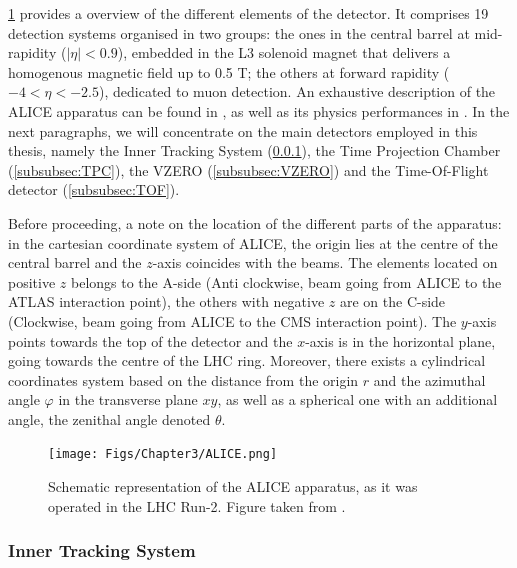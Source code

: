 \Fig\ref{fig:ALICEdetector} provides a overview of the different elements of the detector. It comprises 19 detection systems organised in two groups: the ones in the central barrel at mid-rapidity ($|\eta| < 0.9$), embedded in the L3 solenoid magnet that delivers a homogenous magnetic field up to 0.5 T; the others at forward rapidity ($-4 < \eta < -2.5$), dedicated to muon detection. An exhaustive description of the ALICE apparatus can be found in \cite{alicecollaborationALICEExperimentCERN2008}, as well as its physics performances in \cite{carminatiALICEPhysicsPerformance2004}\cite{alicecollaborationALICEPhysicsPerformance2006}\cite{alicecollaborationPerformanceALICEExperiment2014}. In the next paragraphs, we will concentrate on the main detectors employed in this thesis, namely the Inner Tracking System (\ref{subsubsec:ITS}), the Time Projection Chamber (\ref{subsubsec:TPC}), the VZERO (\ref{subsubsec:VZERO}) and the Time-Of-Flight detector (\ref{subsubsec:TOF}). 

Before proceeding, a note on the location of the different parts of the apparatus: in the cartesian coordinate system of ALICE, the origin lies at the centre of the central barrel and the $z$-axis coincides with the beams. The elements located on positive $z$ belongs to the A-side (Anti clockwise, beam going from ALICE to the ATLAS interaction point), the others with negative $z$ are on the C-side (Clockwise, beam going from ALICE to the CMS interaction point). The $y$-axis points towards the top of the detector and the $x$-axis is in the horizontal plane, going towards the centre of the LHC ring. Moreover, there exists a cylindrical coordinates system based on the distance from the origin $r$ and the azimuthal angle $\varphi$ in the transverse plane $xy$, as well as a spherical one with an additional angle, the zenithal angle denoted $\theta$.


\begin{figure}[t]
	\centering
	\texttt{[image: Figs/Chapter3/ALICE.png]}
	\caption{Schematic representation of the ALICE apparatus, as it was operated in the LHC Run-2. Figure taken from \cite{alicecollaborationALICEExperimentJourney2022}.}
	\label{fig:ALICEdetector}
\end{figure}


\subsubsection{Inner Tracking System}
\label{subsubsec:ITS}


